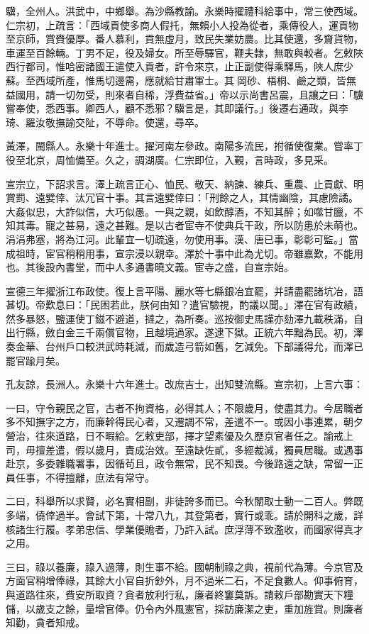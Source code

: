 \begin{pinyinscope}
驥，全州人。洪武中，中鄉舉。為沙縣教諭。永樂時擢禮科給事中，常三使西域。仁宗初，上疏言：「西域貢使多商人假托，無賴小人投為從者，乘傳役人，運貢物至京師，賞賚優厚。番人慕利，貢無虛月，致民失業妨農。比其使還，多齎貨物，車運至百餘輛。丁男不足，役及婦女。所至辱驛官，鞭夫隸，無敢與較者。乞敕陜西行都司，惟哈密諸國王遣使入貢者，許令來京，止正副使得乘驛馬，陜人庶少蘇。至西域所產，惟馬切邊需，應就給甘肅軍士。其岡砂、梧桐、鹼之類，皆無益國用，請一切勿受，則來者自稀，浮費益省。」帝以示尚書呂震，且讓之曰：「驥嘗奉使，悉西事。卿西人，顧不悉邪？驥言是，其即議行。」後遷右通政，與李琦、羅汝敬撫諭交阯，不辱命。使還，尋卒。

黃澤，閩縣人。永樂十年進士。擢河南左參政。南陽多流民，拊循使復業。嘗率丁役至北京，周恤備至。久之，調湖廣。仁宗即位，入覲，言時政，多見采。

宣宗立，下詔求言。澤上疏言正心、恤民、敬天、納諫、練兵、重農、止貢獻、明賞罰、遠嬖倖、汰冗官十事。其言遠嬖倖曰：「刑餘之人，其情幽陰，其慮險譎。大姦似忠，大詐似信，大巧似愚。一與之親，如飲醇酒，不知其醉；如噬甘臘，不知其毒。寵之甚易，遠之甚難。是以古者宦寺不使典兵干政，所以防患於未萌也。涓涓弗塞，將為江河。此輩宜一切疏遠，勿使用事。漢、唐已事，彰彰可監。」當成祖時，宦官稍稍用事，宣宗浸以親幸。澤於十事中此為尤切。帝雖嘉歎，不能用也。其後設內書堂，而中人多通書曉文義。宦寺之盛，自宣宗始。

宣德三年擢浙江布政使。復上言平陽、麗水等七縣銀冶宜罷，并請盡罷諸坑冶，語甚切。帝歎息曰：「民困若此，朕何由知？遣官驗視，酌議以聞。」澤在官有政績，然多暴怒，鹽運使丁鎡不避道，撻之，為所奏。巡按御史馬謹亦劾澤九載秩滿，自出行縣，斂白金三千兩償官物，且越境過家。遂逮下獄。正統六年黜為民。初，澤奏金華、台州戶口較洪武時耗減，而歲造弓箭如舊，乞減免。下部議得允，而澤已罷官踰月矣。

孔友諒，長洲人。永樂十六年進士。改庶吉士，出知雙流縣。宣宗初，上言六事：

一曰，守令親民之官，古者不拘資格，必得其人；不限歲月，使盡其力。今居職者多不知撫字之方，而廉幹得民心者，又遷調不常，差遣不一。或因小事連累，朝夕營治，往來道路，日不暇給。乞敕吏部，擇才望素優及久歷京官者任之。諭戒上司，毋擅差遣，假以歲月，責成治效。至遠缺佐貳，多經裁減，獨員居職。或遇事赴京，多委雜職署事，因循茍且，政令無常，民不知畏。今後路遠之缺，常留一正員任事，不得擅離，庶法有常守。

二曰，科舉所以求賢，必名實相副，非徒誇多而已。今秋闈取士動一二百人。弊既多端，僥倖過半。會試下第，十常八九，其登第者，實行或乖。請於開科之歲，詳核諸生行履。孝弟忠信、學業優贍者，乃許入試。庶浮薄不致濫收，而國家得真才之用。

三曰，祿以養廉，祿入過薄，則生事不給。國朝制祿之典，視前代為薄。今京官及方面官稍增俸祿，其餘大小官自折鈔外，月不過米二石，不足食數人。仰事俯育，與道路往來，費安所取資？貪者放利行私，廉者終窶莫訴。請敕戶部勘實天下糧儲，以歲支之餘，量增官俸。仍令內外風憲官，採訪廉潔之吏，重加旌賞。則廉者知勸，貪者知戒。


\end{pinyinscope}
